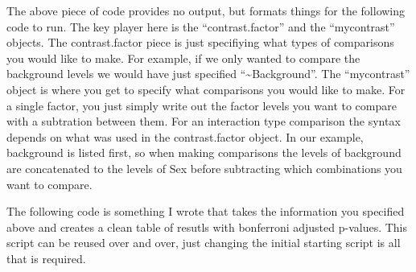 \documentclass[]{article}
\begin{document}
The above piece of code provides no output, but formats things for the
following code to run. The key player here is the ``contrast.factor''
and the ``mycontrast'' objects. The contrast.factor piece is just
specifiying what types of comparisons you would like to make. For
example, if we only wanted to compare the background levels we would
have just specified ``\textasciitilde{}Background''. The ``mycontrast''
object is where you get to specify what comparisons you would like to
make. For a single factor, you just simply write out the factor levels
you want to compare with a subtration between them. For an interaction
type comparison the syntax depends on what was used in the
contrast.factor object. In our example, background is listed first, so
when making comparisons the levels of background are concatenated to the
levels of Sex before subtracting which combinations you want to compare.

The following code is something I wrote that takes the information you
specified above and creates a clean table of resutls with bonferroni
adjusted p-values. This script can be reused over and over, just
changing the initial starting script is all that is required.
\end{document}

